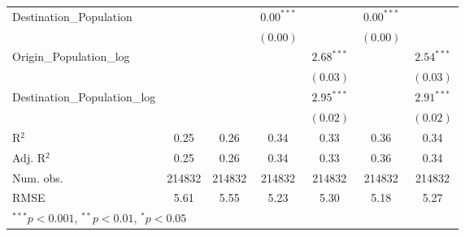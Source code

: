 \begin{table}
\begin{center}
\begin{tabular}{l c c c c c c }
			Destination\_Population      &               &               & $0.00^{***}$  &                & $0.00^{***}$  &                \\
			&               &               & $(0.00)$      &                & $(0.00)$      &                \\
			Origin\_Population\_log      &               &               &               & $2.68^{***}$   &               & $2.54^{***}$   \\
			&               &               &               & $(0.03)$       &               & $(0.03)$       \\
			Destination\_Population\_log &               &               &               & $2.95^{***}$   &               & $2.91^{***}$   \\
			&               &               &               & $(0.02)$       &               & $(0.02)$       \\
			\hline
			R$^2$                        & 0.25          & 0.26          & 0.34          & 0.33           & 0.36          & 0.34           \\
			Adj. R$^2$                   & 0.25          & 0.26          & 0.34          & 0.33           & 0.36          & 0.34           \\
			Num. obs.                    & 214832        & 214832        & 214832        & 214832         & 214832        & 214832         \\
			RMSE                         & 5.61          & 5.55          & 5.23          & 5.30           & 5.18          & 5.27           \\
			\hline
			\multicolumn{7}{l}{\scriptsize{$^{***}p<0.001$, $^{**}p<0.01$, $^*p<0.05$}}
		\end{tabular}
		\label{table:GravityModel2017Q1}
	\end{center}
\end{table}



